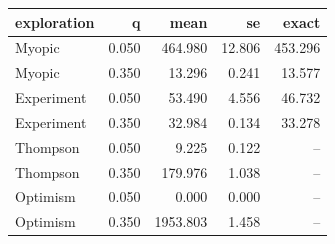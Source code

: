 \begin{tabular}{lrrrr}
\toprule
exploration & q & mean & se & exact \\
\midrule
Myopic & 0.050 & 464.980 & 12.806 & 453.296 \\
Myopic & 0.350 & 13.296 & 0.241 & 13.577 \\
Experiment & 0.050 & 53.490 & 4.556 & 46.732 \\
Experiment & 0.350 & 32.984 & 0.134 & 33.278 \\
Thompson & 0.050 & 9.225 & 0.122 & -- \\
Thompson & 0.350 & 179.976 & 1.038 & -- \\
Optimism & 0.050 & 0.000 & 0.000 & -- \\
Optimism & 0.350 & 1953.803 & 1.458 & -- \\
\bottomrule
\end{tabular}
